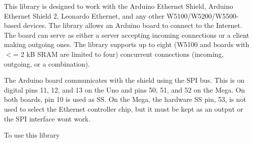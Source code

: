 This library is designed to work with the Arduino Ethernet Shield, Arduino Ethernet Shield 2, Leonardo Ethernet, and any other W5100/\+W5200/\+W5500-\/based devices. The library allows an Arduino board to connect to the Internet. The board can serve as either a server accepting incoming connections or a client making outgoing ones. The library supports up to eight (W5100 and boards with $<$= 2 kB SRAM are limited to four) concurrent connections (incoming, outgoing, or a combination).

The Arduino board communicates with the shield using the SPI bus. This is on digital pins 11, 12, and 13 on the Uno and pins 50, 51, and 52 on the Mega. On both boards, pin 10 is used as SS. On the Mega, the hardware SS pin, 53, is not used to select the Ethernet controller chip, but it must be kept as an output or the SPI interface won\textquotesingle{}t work.





To use this library


\begin{DoxyCode}{0}

\end{DoxyCode}
 